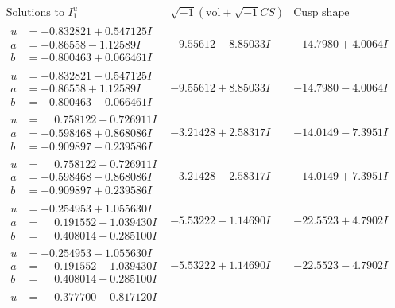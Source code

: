 \documentclass[1p]{elsarticle_modified}
\theoremstyle{definition}
\newcommand{\I}{\sqrt{-1}}
\begin{document}
$$\begin{array}{c|c|c}  
\text{Solutions to }I^u_{1}& \I (\text{vol} + \sqrt{-1}CS) & \text{Cusp shape}\\
 \hline 
\begin{aligned}
u &= -0.832821 + 0.547125 I \\
a &= -0.86558 - 1.12589 I \\
b &= -0.800463 + 0.066461 I\end{aligned}
 & -9.55612 - 8.85033 I & -14.7980 + 4.0064 I \\ \hline\begin{aligned}
u &= -0.832821 - 0.547125 I \\
a &= -0.86558 + 1.12589 I \\
b &= -0.800463 - 0.066461 I\end{aligned}
 & -9.55612 + 8.85033 I & -14.7980 - 4.0064 I \\ \hline\begin{aligned}
u &= \phantom{-}0.758122 + 0.726911 I \\
a &= -0.598468 + 0.868086 I \\
b &= -0.909897 - 0.239586 I\end{aligned}
 & -3.21428 + 2.58317 I & -14.0149 - 7.3951 I \\ \hline\begin{aligned}
u &= \phantom{-}0.758122 - 0.726911 I \\
a &= -0.598468 - 0.868086 I \\
b &= -0.909897 + 0.239586 I\end{aligned}
 & -3.21428 - 2.58317 I & -14.0149 + 7.3951 I \\ \hline\begin{aligned}
u &= -0.254953 + 1.055630 I \\
a &= \phantom{-}0.191552 + 1.039430 I \\
b &= \phantom{-}0.408014 - 0.285100 I\end{aligned}
 & -5.53222 - 1.14690 I & -22.5523 + 4.7902 I \\ \hline\begin{aligned}
u &= -0.254953 - 1.055630 I \\
a &= \phantom{-}0.191552 - 1.039430 I \\
b &= \phantom{-}0.408014 + 0.285100 I\end{aligned}
 & -5.53222 + 1.14690 I & -22.5523 - 4.7902 I \\ \hline\begin{aligned}
u &= \phantom{-}0.377700 + 0.817120 I \\

\end{aligned}
\end{array}$$
\end{document}
